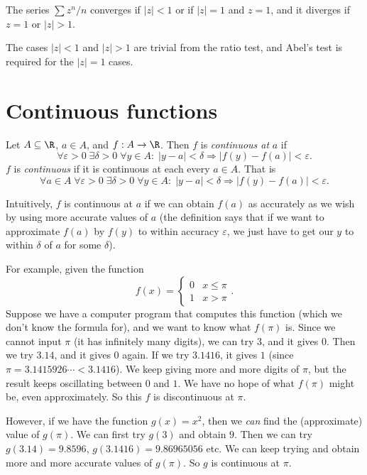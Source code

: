 \documentclass[a4paper]{article}
\begin{document}
\begin{eg}
  The series $\sum z^n/n$ converges if $|z| < 1$ or if $|z| = 1$ and $z = 1$, and it diverges if $z = 1$ or $|z| > 1$.

  The cases $|z| < 1$ and $|z| > 1$ are trivial from the ratio test, and Abel's test is required for the $|z| = 1$ cases.
\end{eg}
\section{Continuous functions}
\begin{defi}
  Let $A\subseteq \R$, $a\in A$, and $f: A\to \R$. Then $f$ is \emph{continuous at} $a$ if
  \[
    \forall \varepsilon > 0\; \exists \delta > 0\; \forall y\in A:\; |y - a| < \delta \Rightarrow  |f(y) - f(a)| < \varepsilon.
  \]
  $f$ is \emph{continuous} if it is continuous at each every $a\in A$. That is
  \[
    \forall a\in A\; \forall \varepsilon > 0\; \exists \delta > 0\; \forall y\in A:\; |y - a| < \delta \Rightarrow  |f(y) - f(a)| < \varepsilon.
  \]
\end{defi}
Intuitively, $f$ is continuous at $a$ if we can obtain $f(a)$ as accurately as we wish by using more accurate values of $a$ (the definition says that if we want to approximate $f(a)$ by $f(y)$ to within accuracy $\varepsilon$, we just have to get our $y$ to within $\delta$ of $a$ for some $\delta$).

For example, given the function
\[
  f(x) = \begin{cases} 0 & x \leq \pi\\ 1& x > \pi\end{cases}.
\]
Suppose we have a computer program that computes this function (which we don't know the formula for), and we want to know what $f(\pi)$ is. Since we cannot input $\pi$ (it has infinitely many digits), we can try $3$, and it gives $0$. Then we try $3.14$, and it gives $0$ again. If we try $3.1416$, it gives $1$ (since $\pi = 3.1415926\cdots < 3.1416$). We keep giving more and more digits of $\pi$, but the result keeps oscillating between $0$ and $1$. We have no hope of what $f(\pi)$ might be, even approximately. So this $f$ is discontinuous at $\pi$.

However, if we have the function $g(x) = x^2$, then we \emph{can} find the (approximate) value of $g(\pi)$. We can first try $g(3)$ and obtain $9$. Then we can try $g(3.14) = 9.8596$, $g(3.1416) = 9.86965056$ etc. We can keep trying and obtain more and more accurate values of $g(\pi)$. So $g$ is continuous at $\pi$.
\end{document}
